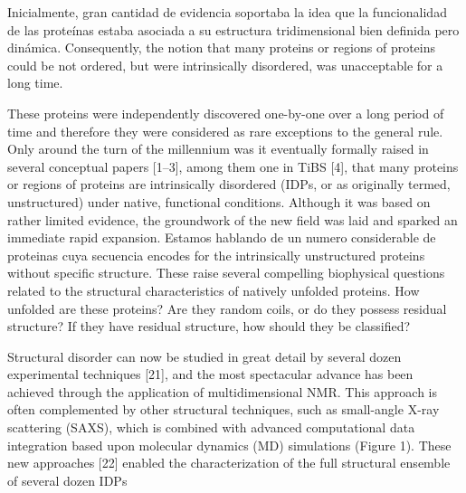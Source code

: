 
Inicialmente, gran cantidad de evidencia soportaba la idea que la funcionalidad de las proteínas estaba asociada a su estructura tridimensional bien definida pero dinámica.
Consequently, the notion that many proteins or regions of proteins could be not ordered, but were intrinsically disordered, was unacceptable for a long time.

These proteins were independently discovered one-by-one over a long period of time and therefore they were considered as rare exceptions to the general rule.
Only around the turn of the millennium was it eventually formally raised in several conceptual papers [1–3], among them one in TiBS [4], that many proteins or regions of proteins 
are intrinsically disordered (IDPs, or as originally termed, unstructured) under native, functional conditions. Although it was based on rather limited evidence, the groundwork of
the new field was laid and sparked an immediate rapid expansion.
Estamos hablando de un numero considerable de proteinas cuya secuencia encodes for the intrinsically unstructured proteins without specific structure.
These raise several compelling biophysical questions related to the structural characteristics of natively unfolded proteins. How unfolded are these proteins? 
Are they random coils, or do they possess residual structure? If they have residual structure, how should they be classified?

Structural disorder can now be studied in great detail by several dozen experimental techniques [21], and the most spectacular advance has been achieved through the application of multidimensional NMR. This approach is often
complemented by other structural techniques, such as small-angle X-ray scattering (SAXS), which is combined with advanced computational data integration based upon molecular dynamics (MD) simulations (Figure 1). These new
approaches [22] enabled the characterization of the full structural ensemble of several dozen IDPs


